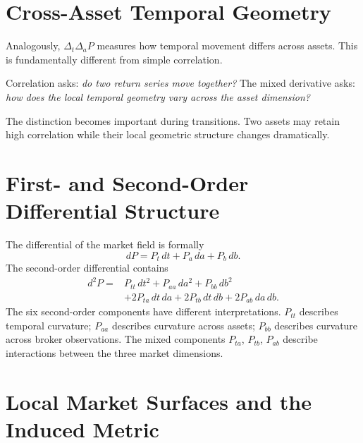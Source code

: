 \documentclass[11pt,a4paper]{article}
\numberwithin{equation}{section}
\begin{document}
\section{Cross-Asset Temporal Geometry}

Analogously, $\Delta_t\Delta_aP$ measures how temporal movement
differs across assets. This is fundamentally different from simple
correlation.

Correlation asks: \emph{do two return series move together?} The
mixed derivative asks: \emph{how does the local temporal geometry
vary across the asset dimension?}

The distinction becomes important during transitions. Two assets may
retain high correlation while their local geometric structure
changes dramatically.

\section{First- and Second-Order Differential Structure}

The differential of the market field is formally
\begin{equation}
dP=P_t\,dt+P_a\,da+P_b\,db.
\label{eq:dP}
\end{equation}
The second-order differential contains
\begin{equation}
\begin{aligned}
d^2P={}&P_{tt}\,dt^2+P_{aa}\,da^2+P_{bb}\,db^2\\
&+2P_{ta}\,dt\,da+2P_{tb}\,dt\,db+2P_{ab}\,da\,db.
\end{aligned}
\label{eq:d2P}
\end{equation}
The six second-order components have different interpretations.
$P_{tt}$ describes temporal curvature; $P_{aa}$ describes curvature
across assets; $P_{bb}$ describes curvature across broker
observations. The mixed components $P_{ta}$, $P_{tb}$, $P_{ab}$
describe interactions between the three market dimensions.

\section{Local Market Surfaces and the Induced Metric}
\end{document}
